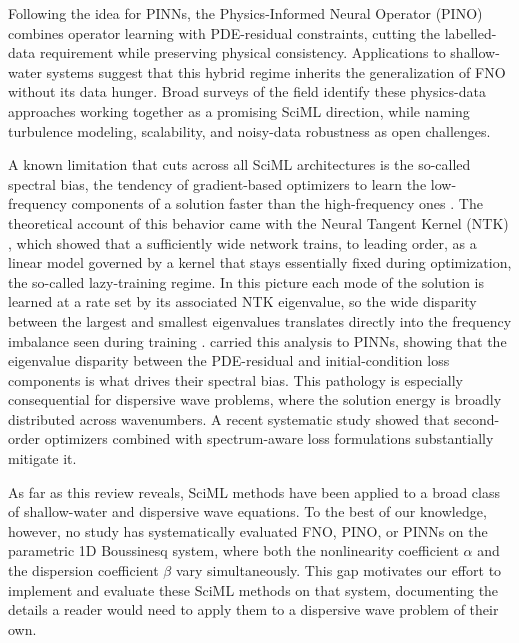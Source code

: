 Following the idea for PINNs, the Physics-Informed Neural Operator (PINO) \parencite{li2023pino} combines operator learning with PDE-residual constraints, cutting the labelled-data requirement while preserving physical consistency. Applications to shallow-water systems \parencite{rosofsky2023} suggest that this hybrid regime inherits the generalization of FNO without its data hunger. Broad surveys of the field \parencite{piml2023review} identify these physics-data approaches working together as a promising SciML direction, while naming turbulence modeling, scalability, and noisy-data robustness as open challenges.

A known limitation that cuts across all SciML architectures is the so-called spectral bias, the tendency of gradient-based optimizers to learn the low-frequency components of a solution faster than the high-frequency ones \parencite{rahaman2019, xu2019frequency}. The theoretical account of this behavior came with the Neural Tangent Kernel (NTK) \parencite{jacot2018}, which showed that a sufficiently wide network trains, to leading order, as a linear model governed by a kernel that stays essentially fixed during optimization, the so-called lazy-training regime. In this picture each mode of the solution is learned at a rate set by its associated NTK eigenvalue, so the wide disparity between the largest and smallest eigenvalues translates directly into the frequency imbalance seen during training \parencite{arora2019, cao2019, bordelon2020}. \textcite{wang2022ntk} carried this analysis to PINNs, showing that the eigenvalue disparity between the PDE-residual and initial-condition loss components is what drives their spectral bias. This pathology is especially consequential for dispersive wave problems, where the solution energy is broadly distributed across wavenumbers. A recent systematic study \parencite{khodakarami2026} showed that second-order optimizers combined with spectrum-aware loss formulations substantially mitigate it.

As far as this review reveals, SciML methods have been applied to a broad class of shallow-water and dispersive wave equations. To the best of our knowledge, however, no study has systematically evaluated FNO, PINO, or PINNs on the parametric 1D Boussinesq system, where both the nonlinearity coefficient $\alpha$ and the dispersion coefficient $\beta$ vary simultaneously. This gap motivates our effort to implement and evaluate these SciML methods on that system, documenting the details a reader would need to apply them to a dispersive wave problem of their own.

